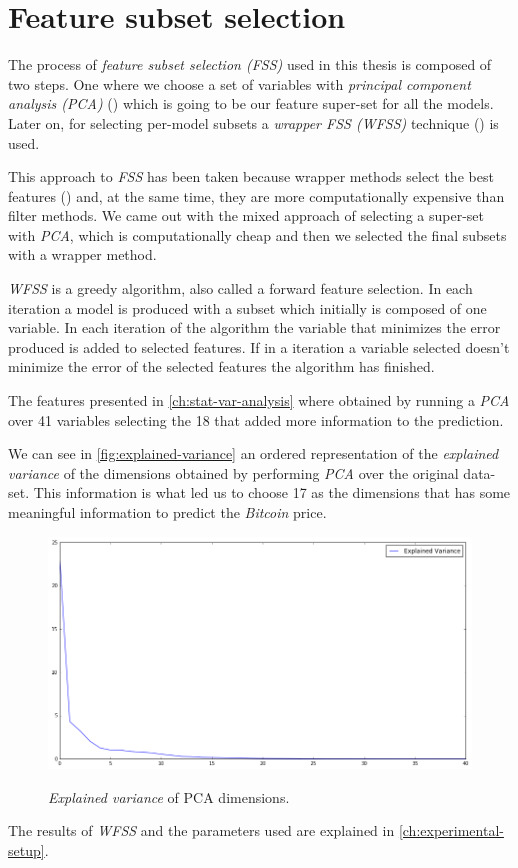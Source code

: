 
\chapter{Feature subset selection}
\label{ch:feature-selection}

The process of \textit{feature subset selection (FSS)} used in this
thesis is composed of two steps. One where we choose a set of
variables with \textit{principal component analysis (PCA)}
(\cite{pearson1901liii}) which is going to be our feature super-set
for all the models. Later on, for selecting per-model subsets a
\textit{wrapper FSS (WFSS)} technique (\cite{kohavi1997wrappers}) is
used.

This approach to \textit{FSS} has been taken because wrapper methods
select the best features (\cite{inza2004filter, kumari2011filter})
and, at the same time, they are more computationally expensive than
filter methods. We came out with the mixed approach of selecting a
super-set with \textit{PCA}, which is computationally cheap and then
we selected the final subsets with a wrapper method.

\textit{WFSS} is a greedy algorithm, also called a forward feature
selection. In each iteration a model is produced with a subset which
initially is composed of one variable. In each iteration of the
algorithm the variable that minimizes the error produced is added to
selected features. If in a iteration a variable selected doesn't
minimize the error of the selected features the algorithm has
finished.

The features presented in \autoref{ch:stat-var-analysis} where
obtained by running a \textit{PCA} over 41 variables selecting the 18
that added more information to the prediction.

We can see in \autoref{fig:explained-variance} an ordered
representation of the \textit{explained variance} of the dimensions
obtained by performing \textit{PCA} over the original data-set. This
information is what led us to choose 17 as the dimensions that has
some meaningful information to predict the \textit{Bitcoin} price.

\begin{figure}[bth]
  \myfloatalign
  {\includegraphics[width=1\linewidth]
    {gfx/explained-variance}}
  \caption{\textit{Explained variance} of PCA dimensions.}
  \label{fig:explained-variance}
\end{figure}

The results of \textit{WFSS} and the parameters used are explained in
\autoref{ch:experimental-setup}.



